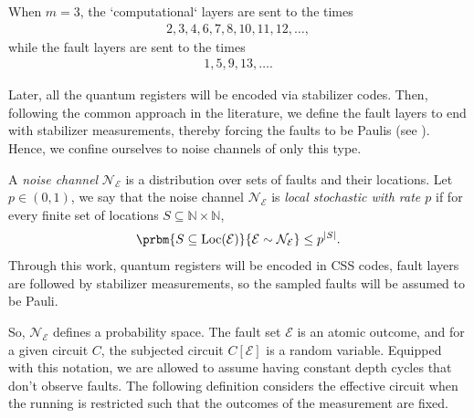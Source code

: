 \begin{example}
  When $m=3$, the `computational` layers are sent to the times
  \begin{equation*}
    \begin{split}
      2,3,4,6,7,8,10,11,12,\ldots,
    \end{split}
  \end{equation*}
  while the fault layers are sent to the times
  \begin{equation*}
    \begin{split}
      1,5,9,13,\ldots.
    \end{split}
  \end{equation*}
\end{example}
Later, all the quantum registers will be encoded via stabilizer codes. Then, following the common approach in the literature, we define the fault layers to end with stabilizer measurements, thereby forcing the faults to be Paulis (see \cite{gottesman1997stabilizercodesquantumerror}). Hence, we confine ourselves to noise channels of only this type.
\begin{definition}
  \label{def:localstoc}
  A \textit{noise channel} $\mathcal{N}_{\mathcal{E}}$ is a distribution over sets of faults and their locations. Let $p\in(0,1)$, we say that the noise channel $\mathcal{N}_{\mathcal{E}}$ is \textit{local stochastic with rate $p$} if for every finite set of locations $S\subseteq \mathbb{N}\times \mathbb{N}$,
  \begin{equation*}
    \begin{split}
      \prbm{S\subseteq \operatorname{Loc}(\mathcal{E})}{\mathcal{E}\sim \mathcal{N}_{\mathcal{E}}}
      \le p^{|S|}.
    \end{split}
  \end{equation*}
Through this work, quantum registers will be encoded in CSS codes, fault layers are followed by stabilizer measurements, so the sampled faults will be assumed to be Pauli.
\end{definition}
So, $\mathcal{N}_{\mathcal{E}}$ defines a probability space. The fault set $\mathcal{E}$ is an atomic outcome, and for a given circuit $C$, the subjected circuit $C[\mathcal{E}]$ is a random variable. Equipped with this notation, we are allowed to assume having constant depth cycles that don't observe faults. The following definition considers the effective circuit when the running is restricted such that the outcomes of the measurement are fixed.

